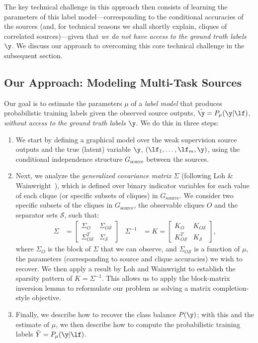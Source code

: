 \documentclass[letterpaper]{article}
\begin{document}
\begin{appendix}
The key technical challenge in this approach then consists of learning the parameters of this label model---corresponding to the conditional accuracies of the sources (and, for technical reasons we shall shortly explain, cliques of correlated sources)---given that \textit{we do not have access to the ground truth labels $\y$}.
We discuss our approach to overcoming this core technical challenge in the subsequent section.


\subsection{Our Approach: Modeling Multi-Task Sources}
\label{appendix:modeling-approach-overview}
Our goal is to estimate the parameters $\mu$ of a \textit{label model} that produces probabilistic training labels given the observed source outputs, $\tilde{\y} = P_\mu(\y|\lf)$, \textit{without access to the ground truth labels $\y$}.
We do this in three steps:
\begin{enumerate} 
	\item We start by defining a graphical model over the weak supervision source outputs and the true (latent) variable $\y$, $(\lf_1,\ldots,\lf_m, \y)$, using the conditional independence structure $G_{\text{source}}$ between the sources.
\item Next, we analyze the \textit{generalized covariance matrix}  $\Sigma$ (following Loh \& Wainwright~\cite{loh2012structure}), which is defined over binary indicator variables for each value of each clique (or specific subsets of cliques) in $G_{\text{source}}$.
	We consider two specific subsets of the cliques in $G_{\text{source}}$, the observable cliques $O$ and the separator sets $\mathcal{S}$, such that:
	\begin{align*}
		\Sigma
		&=
		\begin{bmatrix}
			\Sigma_O & \Sigma_{O\mathcal{S}} \\
			\Sigma_{O\mathcal{S}}^T & \Sigma_\mathcal{S}
		\end{bmatrix}
&
		\Sigma^{-1}
		&=
		K
		=
		\begin{bmatrix}
			K_O & K_{O\mathcal{S}} \\
			K_{O\mathcal{S}}^T & K_\mathcal{S}
		\end{bmatrix},
	\end{align*}
	where $\Sigma_O$ is the block of $\Sigma$ that we can observe, and $\Sigma_{O\mathcal{S}}$ is a function of $\mu$, the parameters (corresponding to source and  clique accuracies) we wish to recover.
	We then apply a result by Loh and Wainwright \cite{loh2012structure} to establish the sparsity pattern of $K = \Sigma^{-1}$.
	This allows us to apply the block-matrix inversion lemma to reformulate our problem as solving a matrix completion-style objective.
\item Finally, we describe how to recover the class balance $P(\y)$; with this and the estimate of $\mu$, we then describe how to compute the probabilistic training labels $\tilde{Y} = P_\mu(\y|\lf)$.
\end{enumerate}


\end{appendix}
\end{document}
